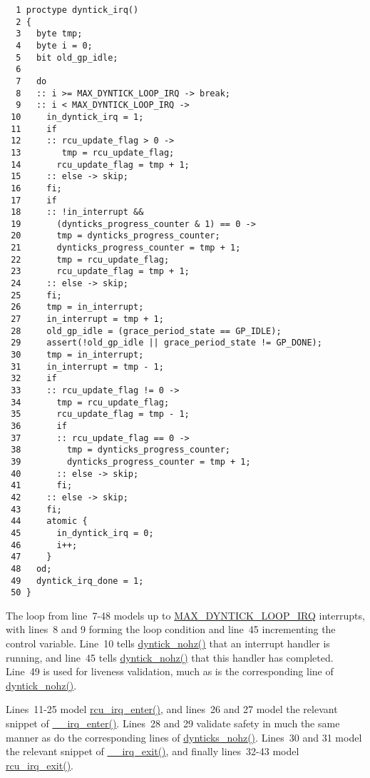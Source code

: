 { \scriptsize
\begin{verbatim}
  1 proctype dyntick_irq()
  2 {
  3   byte tmp;
  4   byte i = 0;
  5   bit old_gp_idle;
  6 
  7   do
  8   :: i >= MAX_DYNTICK_LOOP_IRQ -> break;
  9   :: i < MAX_DYNTICK_LOOP_IRQ ->
 10     in_dyntick_irq = 1;
 11     if
 12     :: rcu_update_flag > 0 ->
 13        tmp = rcu_update_flag;
 14       rcu_update_flag = tmp + 1;
 15     :: else -> skip;
 16     fi;
 17     if
 18     :: !in_interrupt &&
 19       (dynticks_progress_counter & 1) == 0 ->
 20       tmp = dynticks_progress_counter;
 21       dynticks_progress_counter = tmp + 1;
 22       tmp = rcu_update_flag;
 23       rcu_update_flag = tmp + 1;
 24     :: else -> skip;
 25     fi;
 26     tmp = in_interrupt;
 27     in_interrupt = tmp + 1;
 28     old_gp_idle = (grace_period_state == GP_IDLE);
 29     assert(!old_gp_idle || grace_period_state != GP_DONE);
 30     tmp = in_interrupt;
 31     in_interrupt = tmp - 1;
 32     if
 33     :: rcu_update_flag != 0 ->
 34       tmp = rcu_update_flag;
 35       rcu_update_flag = tmp - 1;
 36       if
 37       :: rcu_update_flag == 0 ->
 38         tmp = dynticks_progress_counter;
 39         dynticks_progress_counter = tmp + 1;
 40       :: else -> skip;
 41       fi;
 42     :: else -> skip;
 43     fi;
 44     atomic {
 45       in_dyntick_irq = 0;
 46       i++;
 47     }
 48   od;
 49   dyntick_irq_done = 1;
 50 }
\end{verbatim}
}

The loop from line~7-48 models up to \url{MAX_DYNTICK_LOOP_IRQ}
interrupts, with lines~8 and 9 forming the loop condition and line~45
incrementing the control variable.
Line~10 tells \url{dyntick_nohz()} that an interrupt handler
is running, and line~45 tells \url{dyntick_nohz()} that this
handler has completed.
Line~49 is used for liveness validation, much as is the corresponding
line of \url{dyntick_nohz()}.

 \QuickQuizEnd

Lines~11-25 model \url{rcu_irq_enter()}, and
lines~26 and 27 model the relevant snippet of \url{__irq_enter()}.
Lines~28 and 29 validate safety in much the same manner as do the
corresponding lines of \url{dynticks_nohz()}.
Lines~30 and 31 model the relevant snippet of \url{__irq_exit()},
and finally lines~32-43 model \url{rcu_irq_exit()}.

